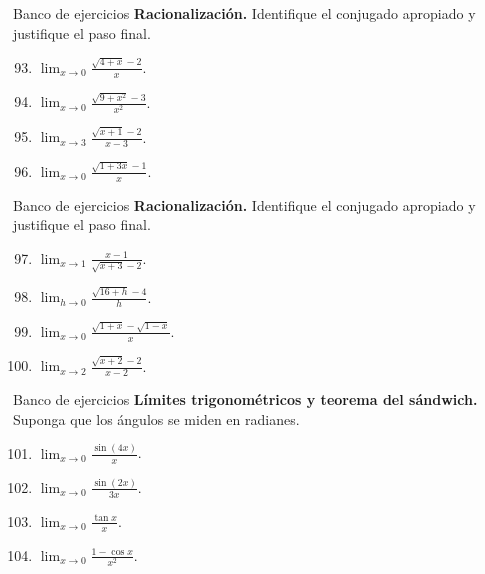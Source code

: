 \documentclass[12pt,aspectratio=169]{beamer}
\begin{document}
\begin{frame}[t,allowframebreaks]{Banco de ejercicios}
\small
\noindent \textbf{Racionalización.} Identifique el conjugado apropiado y justifique el paso final.\par\smallskip
\begin{enumerate}\setcounter{enumi}{92}
\item $\displaystyle\lim_{x\to0}\frac{\sqrt{4+x}-2}{x}$.
\item $\displaystyle\lim_{x\to0}\frac{\sqrt{9+x^2}-3}{x^2}$.
\item $\displaystyle\lim_{x\to3}\frac{\sqrt{x+1}-2}{x-3}$.
\item $\displaystyle\lim_{x\to0}\frac{\sqrt{1+3x}-1}{x}$.
\end{enumerate}
\end{frame}


\begin{frame}[t,allowframebreaks]{Banco de ejercicios}
\small
\noindent \textbf{Racionalización.} Identifique el conjugado apropiado y justifique el paso final.\par\smallskip
\begin{enumerate}\setcounter{enumi}{96}
\item $\displaystyle\lim_{x\to1}\frac{x-1}{\sqrt{x+3}-2}$.
\item $\displaystyle\lim_{h\to0}\frac{\sqrt{16+h}-4}{h}$.
\item $\displaystyle\lim_{x\to0}\frac{\sqrt{1+x}-\sqrt{1-x}}{x}$.
\item $\displaystyle\lim_{x\to2}\frac{\sqrt{x+2}-2}{x-2}$.
\end{enumerate}
\end{frame}


\begin{frame}[t,allowframebreaks]{Banco de ejercicios}
\small
\noindent \textbf{Límites trigonométricos y teorema del sándwich.} Suponga que los ángulos se miden en radianes.\par\smallskip
\begin{enumerate}\setcounter{enumi}{100}
\item $\displaystyle\lim_{x\to0}\frac{\sin(4x)}{x}$.
\item $\displaystyle\lim_{x\to0}\frac{\sin(2x)}{3x}$.
\item $\displaystyle\lim_{x\to0}\frac{\tan x}{x}$.
\item $\displaystyle\lim_{x\to0}\frac{1-\cos x}{x^2}$.
\end{enumerate}
\end{frame}
\end{document}
